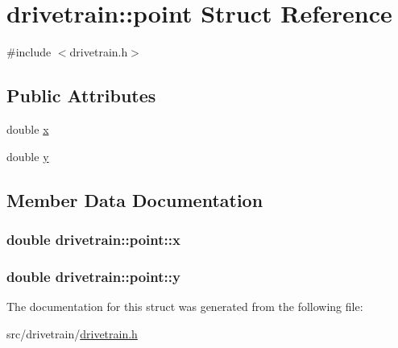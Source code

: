 \hypertarget{structdrivetrain_1_1point}{}\section{drivetrain\+:\+:point Struct Reference}
\label{structdrivetrain_1_1point}


{\ttfamily \#include $<$drivetrain.\+h$>$}

\subsection*{Public Attributes}
\begin{DoxyCompactItemize}
\item 
double \hyperlink{structdrivetrain_1_1point_aacfcb9a37045bcdb34efc7c9570e62cc}{x}
\item 
double \hyperlink{structdrivetrain_1_1point_a9c5fe5b56c6f989680e1ea406ac67cc6}{y}
\end{DoxyCompactItemize}


\subsection{Member Data Documentation}
\subsubsection[{\texorpdfstring{x}{x}}]{\setlength{\rightskip}{0pt plus 5cm}double drivetrain\+::point\+::x}\hypertarget{structdrivetrain_1_1point_aacfcb9a37045bcdb34efc7c9570e62cc}{}\label{structdrivetrain_1_1point_aacfcb9a37045bcdb34efc7c9570e62cc}
\subsubsection[{\texorpdfstring{y}{y}}]{\setlength{\rightskip}{0pt plus 5cm}double drivetrain\+::point\+::y}\hypertarget{structdrivetrain_1_1point_a9c5fe5b56c6f989680e1ea406ac67cc6}{}\label{structdrivetrain_1_1point_a9c5fe5b56c6f989680e1ea406ac67cc6}


The documentation for this struct was generated from the following file\+:\begin{DoxyCompactItemize}
\item 
src/drivetrain/\hyperlink{drivetrain_8h}{drivetrain.\+h}\end{DoxyCompactItemize}
